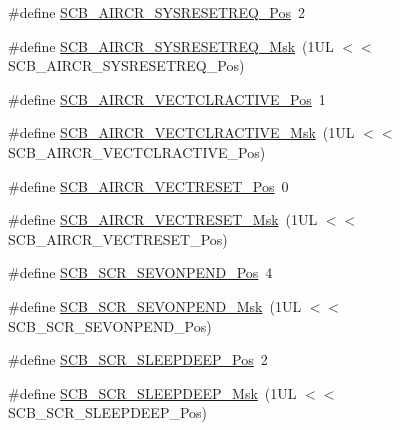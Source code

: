 \begin{DoxyCompactItemize}
\item 
\#define \mbox{\hyperlink{group___c_m_s_i_s___s_c_b_gaffb2737eca1eac0fc1c282a76a40953c}{S\+C\+B\+\_\+\+A\+I\+R\+C\+R\+\_\+\+S\+Y\+S\+R\+E\+S\+E\+T\+R\+E\+Q\+\_\+\+Pos}}~2
\item 
\#define \mbox{\hyperlink{group___c_m_s_i_s___s_c_b_gaae1181119559a5bd36e62afa373fa720}{S\+C\+B\+\_\+\+A\+I\+R\+C\+R\+\_\+\+S\+Y\+S\+R\+E\+S\+E\+T\+R\+E\+Q\+\_\+\+Msk}}~(1\+U\+L $<$$<$ S\+C\+B\+\_\+\+A\+I\+R\+C\+R\+\_\+\+S\+Y\+S\+R\+E\+S\+E\+T\+R\+E\+Q\+\_\+\+Pos)
\item 
\#define \mbox{\hyperlink{group___c_m_s_i_s___s_c_b_gaa30a12e892bb696e61626d71359a9029}{S\+C\+B\+\_\+\+A\+I\+R\+C\+R\+\_\+\+V\+E\+C\+T\+C\+L\+R\+A\+C\+T\+I\+V\+E\+\_\+\+Pos}}~1
\item 
\#define \mbox{\hyperlink{group___c_m_s_i_s___s_c_b_ga212c5ab1c1c82c807d30d2307aa8d218}{S\+C\+B\+\_\+\+A\+I\+R\+C\+R\+\_\+\+V\+E\+C\+T\+C\+L\+R\+A\+C\+T\+I\+V\+E\+\_\+\+Msk}}~(1\+U\+L $<$$<$ S\+C\+B\+\_\+\+A\+I\+R\+C\+R\+\_\+\+V\+E\+C\+T\+C\+L\+R\+A\+C\+T\+I\+V\+E\+\_\+\+Pos)
\item 
\#define \mbox{\hyperlink{group___c_m_s_i_s___s_c_b_ga0d483d9569cd9d1b46ec0d171b1f18d8}{S\+C\+B\+\_\+\+A\+I\+R\+C\+R\+\_\+\+V\+E\+C\+T\+R\+E\+S\+E\+T\+\_\+\+Pos}}~0
\item 
\#define \mbox{\hyperlink{group___c_m_s_i_s___s_c_b_ga3006e31968bb9725e7b4ee0784d99f7f}{S\+C\+B\+\_\+\+A\+I\+R\+C\+R\+\_\+\+V\+E\+C\+T\+R\+E\+S\+E\+T\+\_\+\+Msk}}~(1\+U\+L $<$$<$ S\+C\+B\+\_\+\+A\+I\+R\+C\+R\+\_\+\+V\+E\+C\+T\+R\+E\+S\+E\+T\+\_\+\+Pos)
\item 
\#define \mbox{\hyperlink{group___c_m_s_i_s___s_c_b_ga3bddcec40aeaf3d3a998446100fa0e44}{S\+C\+B\+\_\+\+S\+C\+R\+\_\+\+S\+E\+V\+O\+N\+P\+E\+N\+D\+\_\+\+Pos}}~4
\item 
\#define \mbox{\hyperlink{group___c_m_s_i_s___s_c_b_gafb98656644a14342e467505f69a997c9}{S\+C\+B\+\_\+\+S\+C\+R\+\_\+\+S\+E\+V\+O\+N\+P\+E\+N\+D\+\_\+\+Msk}}~(1\+U\+L $<$$<$ S\+C\+B\+\_\+\+S\+C\+R\+\_\+\+S\+E\+V\+O\+N\+P\+E\+N\+D\+\_\+\+Pos)
\item 
\#define \mbox{\hyperlink{group___c_m_s_i_s___s_c_b_gab304f6258ec03bd9a6e7a360515c3cfe}{S\+C\+B\+\_\+\+S\+C\+R\+\_\+\+S\+L\+E\+E\+P\+D\+E\+E\+P\+\_\+\+Pos}}~2
\item 
\#define \mbox{\hyperlink{group___c_m_s_i_s___s_c_b_ga77c06a69c63f4b3f6ec1032e911e18e7}{S\+C\+B\+\_\+\+S\+C\+R\+\_\+\+S\+L\+E\+E\+P\+D\+E\+E\+P\+\_\+\+Msk}}~(1\+U\+L $<$$<$ S\+C\+B\+\_\+\+S\+C\+R\+\_\+\+S\+L\+E\+E\+P\+D\+E\+E\+P\+\_\+\+Pos)
\item 
$$
\end{DoxyCompactItemize}
